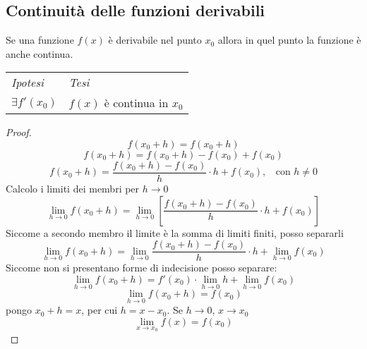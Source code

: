 \documentclass{article}     %
\begin{document}
    \subsection{Continuità delle funzioni derivabili}
        \begin{shadedTheorem}
            Se una funzione $f(x)$ è derivabile nel punto $x_0$ allora in quel punto la funzione è anche continua.
        \end{shadedTheorem}
        \begin{tabular}{m{}m{}}
            \textit{Ipotesi} & \textit{Tesi}  \\
            $\exists f'(x_0)$ & $f(x)$ è continua in $x_0$
        \end{tabular}
        \begin{proof}
        \[f(x_0+h)=f(x_0+h)\]
        \[f(x_0+h)=f(x_0+h)-f(x_0)+f(x_0)\]
        \[f(x_0+h)=\frac{f(x_0+h)-f(x_0)}{h}\cdot h+f(x_0), ~~~~\text{con } h\neq 0\]
        Calcolo i limiti dei membri per $h \to 0$
        \[\lim_{h\to 0}f(x_0+h)=\lim_{h\to0}\left[\frac{f(x_0+h)-f(x_0)}{h}\cdot h+f(x_0)\right]\]
        Siccome a secondo membro il limite è la somma di limiti finiti, posso separarli
        \[\lim_{h\to 0}f(x_0+h)=\lim_{h\to0}\frac{f(x_0+h)-f(x_0)}{h}\cdot h+\lim_{h\to0}f(x_0)\]
        Siccome non si presentano forme di indecisione posso separare:
        \[\lim_{h\to 0}f(x_0+h)=f'(x_0)\cdot \lim_{h\to0} h+\lim_{h\to0}f(x_0)\]
        \[\lim_{h\to 0}f(x_0+h)=f(x_0)\]
        pongo $x_0+h = x$, per cui $h=x-x_0$. Se $h\to 0$, $x\to x_0$
        \[\lim_{x\to x_0}f(x) = f(x_0)\]
        \end{proof}
\end{document}
